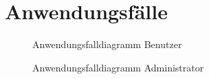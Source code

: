 \newpage
\section{Anwendungsfälle}

\begin{figure}[hb]
    \caption{Anwendungsfalldiagramm Benutzer}
\end{figure}

\begin{figure}[hb]
    \caption{Anwendungsfalldiagramm Administrator}
\end{figure}